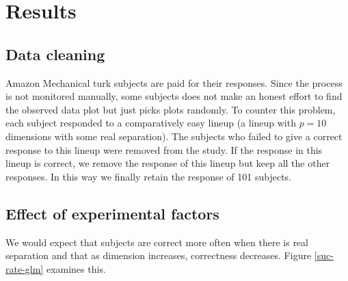 \section{Results}



\subsection{Data cleaning}

Amazon Mechanical turk subjects are paid for their responses. Since the process is not monitored manually, some subjects does not make an honest effort to find the observed data plot but just picks plots randomly. To counter this problem, each subject responded to a comparatively easy lineup (a lineup with $p = 10$ dimensions with some real separation). The subjects who failed to give a correct response to this lineup were removed from the study. If the response in this lineup is correct, we remove the response of this lineup but keep all the other responses. In this way we finally retain the response of 101 subjects.  

\subsection{Effect of experimental factors} \label{effects}

We would expect that subjects are correct more often when there is real separation and that as dimension increases, correctness decreases. Figure \ref{suc-rate-glm} examines this.

